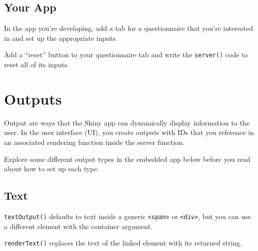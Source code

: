 \documentclass[
  oneside]{book}
\newenvironment{Shaded}{\begin{snugshade}}{\end{snugshade}}
\newcommand{\AttributeTok}[1]{\textcolor[rgb]{0.77,0.63,0.00}{#1}}
\newcommand{\CommentTok}[1]{\textcolor[rgb]{0.56,0.35,0.01}{\textit{#1}}}
\newcommand{\FunctionTok}[1]{\textcolor[rgb]{0.00,0.00,0.00}{#1}}
\newcommand{\NormalTok}[1]{#1}
\newcommand{\OtherTok}[1]{\textcolor[rgb]{0.56,0.35,0.01}{#1}}
\newcommand{\SpecialCharTok}[1]{\textcolor[rgb]{0.00,0.00,0.00}{#1}}
\newcommand{\StringTok}[1]{\textcolor[rgb]{0.31,0.60,0.02}{#1}}
\begin{document}
\hypertarget{your-app-inputs}{%
\section{Your App}\label{your-app-inputs}}

In the app you're developing, add a tab for a questionnaire that you're interested in and set up the appropriate inputs.

Add a ``reset'' button to your questionnaire tab and write the \texttt{server}\texttt{()} code to reset all of its inputs.

\hypertarget{outputs}{%
\chapter{Outputs}\label{outputs}}

Output are ways that the Shiny app can dynamically display information to the user. In the user interface (UI), you create outputs with IDs that you reference in an associated rendering function inside the server function.

Explore some different output types in the embedded app below before you read about how to set up each type.

\hypertarget{text}{%
\section{Text}\label{text}}

\texttt{textOutput}\texttt{()} defaults to text inside a generic \texttt{\textless{}span\textgreater{}} or \texttt{\textless{}div\textgreater{}}, but you can use a different element with the \AttributeTok{container} argument.

\begin{Shaded}
\end{Shaded}

\texttt{renderText}\texttt{()} replaces the text of the linked element with its returned string.

\begin{Shaded}
\end{Shaded}
\end{document}
